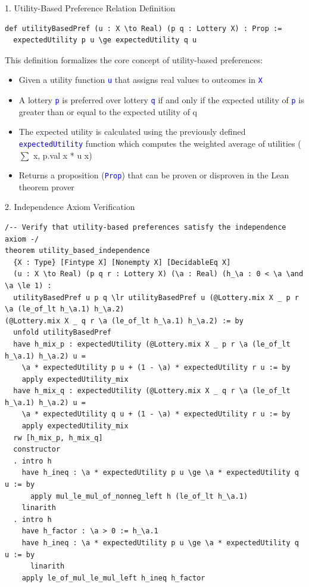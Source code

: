 \documentclass{article}
\theoremstyle{definition}
\newcommand{\tactic}[1]{\textcolor{blue}{\texttt{#1}}}
\begin{document}
1. Utility-Based Preference Relation Definition
\begin{lstlisting}
def utilityBasedPref (u : X \to Real) (p q : Lottery X) : Prop :=
  expectedUtility p u \ge expectedUtility q u
\end{lstlisting}

This definition formalizes the core concept of utility-based preferences:
\begin{itemize}
  \item Given a utility function \tactic{u} that assigns real values to outcomes in \tactic{X}
  \item A lottery \tactic{p} is preferred over lottery \tactic{q} if and only if the expected utility of \tactic{p} is greater than or equal to the expected utility of {q}
  \item The expected utility is calculated using the previously defined \tactic{expectedUtility} function which computes the weighted average of utilities ($\sum$ x, p.val x * u x)
  \item Returns a proposition (\tactic{Prop}) that can be proven or disproven in the Lean theorem prover
\end{itemize}

2. Independence Axiom Verification
\begin{lstlisting}
/-- Verify that utility-based preferences satisfy the independence axiom -/
theorem utility_based_independence
  {X : Type} [Fintype X] [Nonempty X] [DecidableEq X]
  (u : X \to Real) (p q r : Lottery X) (\a : Real) (h_\a : 0 < \a \and \a \le 1) :
  utilityBasedPref u p q \lr utilityBasedPref u (@Lottery.mix X _ p r \a (le_of_lt h_\a.1) h_\a.2)
(@Lottery.mix X _ q r \a (le_of_lt h_\a.1) h_\a.2) := by
  unfold utilityBasedPref
  have h_mix_p : expectedUtility (@Lottery.mix X _ p r \a (le_of_lt h_\a.1) h_\a.2) u =
    \a * expectedUtility p u + (1 - \a) * expectedUtility r u := by
    apply expectedUtility_mix
  have h_mix_q : expectedUtility (@Lottery.mix X _ q r \a (le_of_lt h_\a.1) h_\a.2) u =
    \a * expectedUtility q u + (1 - \a) * expectedUtility r u := by
    apply expectedUtility_mix
  rw [h_mix_p, h_mix_q]
  constructor
  . intro h
    have h_ineq : \a * expectedUtility p u \ge \a * expectedUtility q u := by
      apply mul_le_mul_of_nonneg_left h (le_of_lt h_\a.1)
    linarith
  . intro h
    have h_factor : \a > 0 := h_\a.1
    have h_ineq : \a * expectedUtility p u \ge \a * expectedUtility q u := by
      linarith
    apply le_of_mul_le_mul_left h_ineq h_factor
\end{lstlisting}
\end{document}
